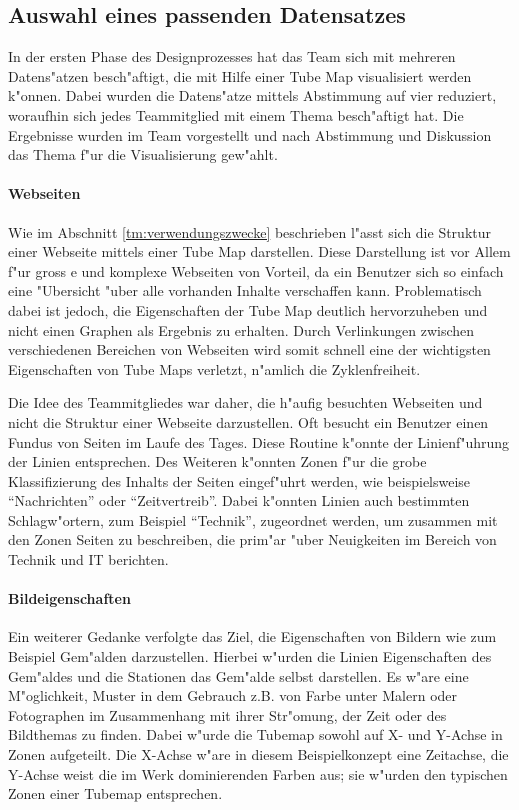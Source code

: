 \subsection{Auswahl eines passenden Datensatzes}
In der ersten Phase des Designprozesses hat das Team sich mit mehreren Datens"atzen besch"aftigt, die mit Hilfe einer Tube Map visualisiert werden k"onnen. Dabei wurden die Datens"atze mittels Abstimmung auf vier reduziert, woraufhin sich jedes Teammitglied mit einem Thema besch"aftigt hat. Die Ergebnisse wurden im Team vorgestellt und nach Abstimmung und Diskussion das Thema f"ur die Visualisierung gew"ahlt.

\paragraph{Webseiten}
Wie im Abschnitt \ref{tm:verwendungszwecke} beschrieben l"asst sich die Struktur einer Webseite mittels einer Tube Map darstellen.  Diese Darstellung ist vor Allem f"ur gross e und komplexe Webseiten von Vorteil, da ein Benutzer sich so einfach eine "Ubersicht "uber alle vorhanden Inhalte verschaffen kann. Problematisch dabei ist jedoch, die Eigenschaften der Tube Map deutlich hervorzuheben und nicht einen Graphen als Ergebnis zu erhalten. Durch Verlinkungen zwischen verschiedenen Bereichen von Webseiten wird somit schnell eine der wichtigsten Eigenschaften von Tube Maps verletzt, n"amlich die Zyklenfreiheit.

Die Idee des Teammitgliedes war daher, die h"aufig besuchten Webseiten und nicht die Struktur einer Webseite darzustellen. Oft besucht ein Benutzer einen Fundus von Seiten im Laufe des Tages. Diese Routine k"onnte der Linienf"uhrung der Linien entsprechen. Des Weiteren k"onnten Zonen f"ur die grobe Klassifizierung des Inhalts der Seiten eingef"uhrt werden, wie beispielsweise "`Nachrichten"' oder "`Zeitvertreib"'. Dabei k"onnten Linien auch bestimmten Schlagw"ortern, zum Beispiel "`Technik"', zugeordnet werden, um zusammen mit den Zonen Seiten zu beschreiben, die prim"ar "uber Neuigkeiten im Bereich von Technik und IT berichten. 

\paragraph{Bildeigenschaften}
Ein weiterer Gedanke verfolgte das Ziel, die Eigenschaften von Bildern wie zum Beispiel Gem"alden darzustellen. Hierbei w"urden die Linien Eigenschaften des Gem"aldes und die Stationen das Gem"alde selbst darstellen. Es w"are eine M"oglichkeit, Muster in dem Gebrauch z.B. von Farbe unter Malern oder Fotographen im Zusammenhang mit ihrer Str"omung, der Zeit oder des Bildthemas zu finden. Dabei w"urde die Tubemap sowohl auf X- und Y-Achse in Zonen aufgeteilt. Die X-Achse w"are in diesem Beispielkonzept eine Zeitachse, die Y-Achse weist die im Werk dominierenden Farben aus; sie w"urden den typischen Zonen einer Tubemap entsprechen.

